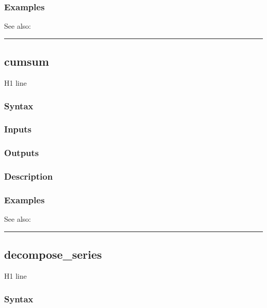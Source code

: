 \documentclass[letterpaper,10pt,english]{sphinxmanual}
\begin{document}
\subsubsection{Examples}
\label{classes/time_series/@ts/ts:id163}
See also:


\bigskip\hrule{}\bigskip



\subsection{cumsum}
\label{classes/time_series/@ts/ts:cumsum}\label{classes/time_series/@ts/ts:id164}
H1 line


\subsubsection{Syntax}
\label{classes/time_series/@ts/ts:id165}

\subsubsection{Inputs}
\label{classes/time_series/@ts/ts:id166}

\subsubsection{Outputs}
\label{classes/time_series/@ts/ts:id167}

\subsubsection{Description}
\label{classes/time_series/@ts/ts:id168}

\subsubsection{Examples}
\label{classes/time_series/@ts/ts:id169}
See also:


\bigskip\hrule{}\bigskip



\subsection{decompose\_series}
\label{classes/time_series/@ts/ts:id170}\label{classes/time_series/@ts/ts:decompose-series}
H1 line


\subsubsection{Syntax}
\label{classes/time_series/@ts/ts:id171}
\end{document}
